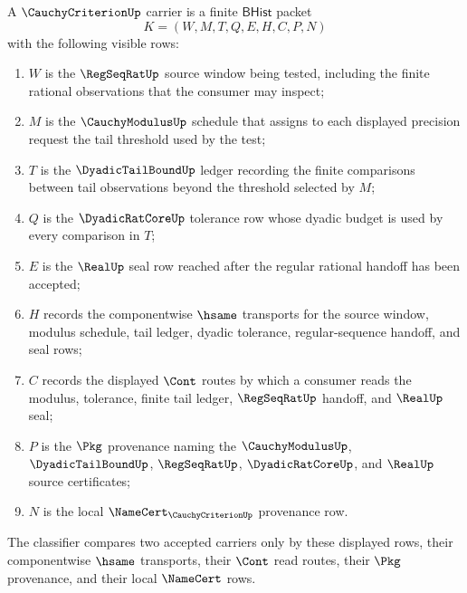 \begin{definition}
\label{def:cauchycriterion-carrier}
A $\CauchyCriterionUp$ carrier is a finite $\mathsf{BHist}$ packet
$$
K=(W,M,T,Q,E,H,C,P,N)
$$
with the following visible rows:
\begin{enumerate}
\item $W$ is the $\RegSeqRatUp$ source window being tested, including the finite rational observations that the consumer may inspect;
\item $M$ is the $\CauchyModulusUp$ schedule that assigns to each displayed precision request the tail threshold used by the test;
\item $T$ is the $\DyadicTailBoundUp$ ledger recording the finite comparisons between tail observations beyond the threshold selected by $M$;
\item $Q$ is the $\DyadicRatCoreUp$ tolerance row whose dyadic budget is used by every comparison in $T$;
\item $E$ is the $\RealUp$ seal row reached after the regular rational handoff has been accepted;
\item $H$ records the componentwise $\hsame$ transports for the source window, modulus schedule, tail ledger, dyadic tolerance, regular-sequence handoff, and seal rows;
\item $C$ records the displayed $\Cont$ routes by which a consumer reads the modulus, tolerance, finite tail ledger, $\RegSeqRatUp$ handoff, and $\RealUp$ seal;
\item $P$ is the $\Pkg$ provenance naming the $\CauchyModulusUp$, $\DyadicTailBoundUp$, $\RegSeqRatUp$, $\DyadicRatCoreUp$, and $\RealUp$ source certificates;
\item $N$ is the local $\NameCert_{\CauchyCriterionUp}$ provenance row.
\end{enumerate}
The classifier compares two accepted carriers only by these displayed rows, their componentwise $\hsame$ transports, their $\Cont$ read routes, their $\Pkg$ provenance, and their local $\NameCert$ rows.
\end{definition}

